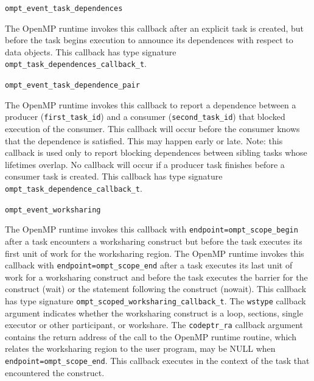 \documentclass{article}
\newcommand{\descheader}[1]{{\needspace{3\baselineskip}\vspace{1em}\noindent \fbox{#1}}}
\begin{document}
\begin{description}
\sloppy


\item \verb|ompt_event_task_dependences|

  The OpenMP runtime invokes this callback after an explicit task is created, 
  but before the task begins execution to announce its dependences with respect to data objects. 
  This callback has type signature \verb|ompt_task_dependences_callback_t|.
  
\item \verb|ompt_event_task_dependence_pair|

The OpenMP runtime invokes this callback to report a dependence between a producer (\verb|first_task_id|) 
and a consumer (\verb|second_task_id|) that blocked execution of the consumer.
This callback will occur before the consumer knows that the dependence is satisfied. This may happen early or late.
Note: this callback is used only to report blocking dependences between sibling tasks whose lifetimes overlap. 
No callback will occur if a producer task finishes before a consumer task is created.
This callback has type signature \verb|ompt_task_dependence_callback_t|. 
\end{description}


\descheader{Worksharing}

\begin{description}

\item \verb|ompt_event_worksharing|

\sloppy
The OpenMP runtime invokes this callback with \verb|endpoint=ompt_scope_begin| after a task encounters a worksharing 
construct but before the task executes its first unit of work for the worksharing region. 
The OpenMP runtime invokes this callback with \verb|endpoint=ompt_scope_end| after a task executes 
its last unit of work for a worksharing construct and before the task executes the barrier  for the construct (wait) or the statement following the construct (nowait).
This callback has type signature \verb|ompt_scoped_worksharing_callback_t|.
The \verb|wstype| callback argument indicates whether the worksharing construct is a loop, sections, single executor or other participant, 
or workshare.
The \verb|codeptr_ra| callback argument contains the return address of the call to the OpenMP runtime routine, which relates the worksharing region to the user program,
may be NULL when \verb|endpoint=|\verb|ompt_scope_end|.
This callback executes in the context of the task that encountered the construct. 

\end{description}
\end{document}

